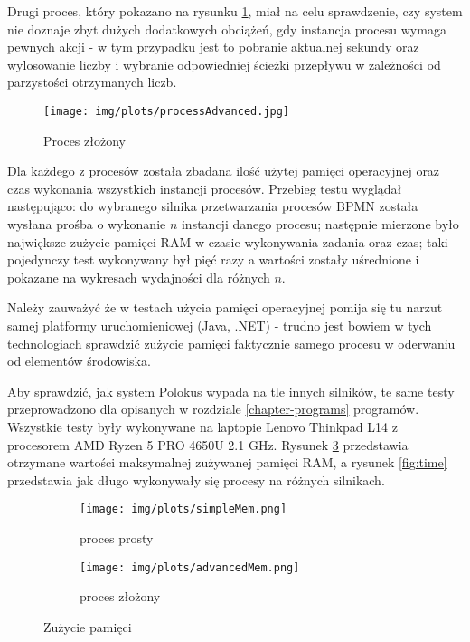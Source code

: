 \documentclass[declaration,shortabstract,mgr]{iithesis}
\newcommand{\bpmn}{BPMN }
\begin{document}
Drugi proces, który pokazano na rysunku \ref{process-advanced}, miał na celu sprawdzenie, czy system nie doznaje zbyt dużych dodatkowych obciążeń, gdy instancja procesu wymaga pewnych akcji - w tym przypadku jest to pobranie aktualnej sekundy oraz wylosowanie liczby i wybranie odpowiedniej ścieżki przepływu w zależności od parzystości otrzymanych liczb.

\begin{figure}[h]
     \centering
     \texttt{[image: img/plots/processAdvanced.jpg]}
     \caption{Proces złożony}
     \label{process-advanced}
\end{figure}

Dla każdego z procesów została zbadana ilość użytej pamięci operacyjnej oraz czas wykonania wszystkich instancji procesów. Przebieg testu wyglądał następująco: do wybranego silnika przetwarzania procesów \bpmn została wysłana prośba o wykonanie $n$ instancji danego procesu; następnie mierzone było największe zużycie pamięci RAM w czasie wykonywania zadania oraz czas; taki pojedynczy test wykonywany był pięć razy a wartości zostały uśrednione i pokazane na wykresach wydajności dla różnych $n$.

Należy zauważyć że w testach użycia pamięci operacyjnej pomija się
tu narzut samej platformy uruchomieniowej (Java, .NET) - trudno jest
bowiem w tych technologiach sprawdzić zużycie pamięci faktycznie samego
procesu w oderwaniu od elementów środowiska. 

Aby sprawdzić, jak system Polokus wypada na tle innych silników, te same testy przeprowadzono dla opisanych w rozdziale \ref{chapter-programs} programów. Wszystkie testy były wykonywane na laptopie Lenovo Thinkpad L14 z procesorem AMD Ryzen 5 PRO 4650U 2.1 GHz. Rysunek \ref{fig:mem} przedstawia otrzymane wartości maksymalnej zużywanej pamięci RAM, a rysunek \ref{fig:time} przedstawia jak długo wykonywały się procesy na różnych silnikach.

\begin{figure}[H]
     \centering
     \begin{subfigure}[b]{0.49\textwidth}
         \centering
         \texttt{[image: img/plots/simpleMem.png]}
         \caption{proces prosty}
     \end{subfigure}
     \hfill
     \begin{subfigure}[b]{0.49\textwidth}
         \centering
         \texttt{[image: img/plots/advancedMem.png]}
         \caption{proces złożony}
         \label{fig:mem-adv}
     \end{subfigure}
        \caption{Zużycie pamięci}
        \label{fig:mem}
\end{figure}
\end{document}
